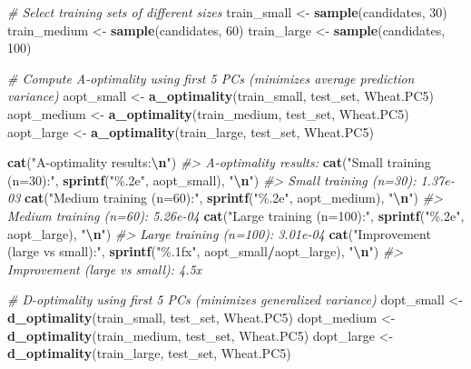 \documentclass[
]{article}
\newenvironment{Shaded}{\begin{snugshade}}{\end{snugshade}}
\newcommand{\CommentTok}[1]{\textcolor[rgb]{0.56,0.35,0.01}{\textit{#1}}}
\newcommand{\DecValTok}[1]{\textcolor[rgb]{0.00,0.00,0.81}{#1}}
\newcommand{\FunctionTok}[1]{\textcolor[rgb]{0.13,0.29,0.53}{\textbf{#1}}}
\newcommand{\NormalTok}[1]{#1}
\newcommand{\OtherTok}[1]{\textcolor[rgb]{0.56,0.35,0.01}{#1}}
\newcommand{\SpecialCharTok}[1]{\textcolor[rgb]{0.81,0.36,0.00}{\textbf{#1}}}
\newcommand{\StringTok}[1]{\textcolor[rgb]{0.31,0.60,0.02}{#1}}
\begin{document}
\begin{Shaded}
\begin{Highlighting}[]
\CommentTok{\# Select training sets of different sizes}
\NormalTok{train\_small }\OtherTok{\textless{}{-}} \FunctionTok{sample}\NormalTok{(candidates, }\DecValTok{30}\NormalTok{)}
\NormalTok{train\_medium }\OtherTok{\textless{}{-}} \FunctionTok{sample}\NormalTok{(candidates, }\DecValTok{60}\NormalTok{)}
\NormalTok{train\_large }\OtherTok{\textless{}{-}} \FunctionTok{sample}\NormalTok{(candidates, }\DecValTok{100}\NormalTok{)}

\CommentTok{\# Compute A{-}optimality using first 5 PCs (minimizes average prediction variance)}
\NormalTok{aopt\_small }\OtherTok{\textless{}{-}} \FunctionTok{a\_optimality}\NormalTok{(train\_small, test\_set, Wheat.PC5)}
\NormalTok{aopt\_medium }\OtherTok{\textless{}{-}} \FunctionTok{a\_optimality}\NormalTok{(train\_medium, test\_set, Wheat.PC5)}
\NormalTok{aopt\_large }\OtherTok{\textless{}{-}} \FunctionTok{a\_optimality}\NormalTok{(train\_large, test\_set, Wheat.PC5)}

\FunctionTok{cat}\NormalTok{(}\StringTok{"A{-}optimality results:}\SpecialCharTok{\textbackslash{}n}\StringTok{"}\NormalTok{)}
\CommentTok{\#\textgreater{} A{-}optimality results:}
\FunctionTok{cat}\NormalTok{(}\StringTok{"Small training (n=30):"}\NormalTok{, }\FunctionTok{sprintf}\NormalTok{(}\StringTok{"\%.2e"}\NormalTok{, aopt\_small), }\StringTok{"}\SpecialCharTok{\textbackslash{}n}\StringTok{"}\NormalTok{)}
\CommentTok{\#\textgreater{} Small training (n=30): 1.37e{-}03}
\FunctionTok{cat}\NormalTok{(}\StringTok{"Medium training (n=60):"}\NormalTok{, }\FunctionTok{sprintf}\NormalTok{(}\StringTok{"\%.2e"}\NormalTok{, aopt\_medium), }\StringTok{"}\SpecialCharTok{\textbackslash{}n}\StringTok{"}\NormalTok{)}
\CommentTok{\#\textgreater{} Medium training (n=60): 5.26e{-}04}
\FunctionTok{cat}\NormalTok{(}\StringTok{"Large training (n=100):"}\NormalTok{, }\FunctionTok{sprintf}\NormalTok{(}\StringTok{"\%.2e"}\NormalTok{, aopt\_large), }\StringTok{"}\SpecialCharTok{\textbackslash{}n}\StringTok{"}\NormalTok{)}
\CommentTok{\#\textgreater{} Large training (n=100): 3.01e{-}04}
\FunctionTok{cat}\NormalTok{(}\StringTok{"Improvement (large vs small):"}\NormalTok{, }\FunctionTok{sprintf}\NormalTok{(}\StringTok{"\%.1fx"}\NormalTok{, aopt\_small}\SpecialCharTok{/}\NormalTok{aopt\_large), }\StringTok{"}\SpecialCharTok{\textbackslash{}n}\StringTok{"}\NormalTok{)}
\CommentTok{\#\textgreater{} Improvement (large vs small): 4.5x}

\CommentTok{\# D{-}optimality using first 5 PCs (minimizes generalized variance)}
\NormalTok{dopt\_small }\OtherTok{\textless{}{-}} \FunctionTok{d\_optimality}\NormalTok{(train\_small, test\_set, Wheat.PC5)}
\NormalTok{dopt\_medium }\OtherTok{\textless{}{-}} \FunctionTok{d\_optimality}\NormalTok{(train\_medium, test\_set, Wheat.PC5)}
\NormalTok{dopt\_large }\OtherTok{\textless{}{-}} \FunctionTok{d\_optimality}\NormalTok{(train\_large, test\_set, Wheat.PC5)}


\end{Highlighting}
\end{Shaded}
\end{document}
